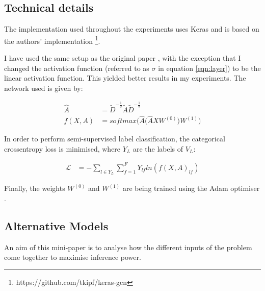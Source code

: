 \documentclass[10pt,a4]{article}
\begin{document}
    \subsection{Technical details}

    The implementation used throughout the experiments uses Keras \cite{chollet2015} 
    and is based on the authors' implementation \footnote{https://github.com/tkipf/keras-gcn}.

    I have used the same setup as the original paper \cite{kipf2016semi}, with 
    the exception that I changed the activation function (referred to as $\sigma$
    in equation \ref{eqn:layer}) to be the linear activation function. This yielded
    better results in my experiments. The network used is given by:
   
    \begin{align}
        \hat{A} &= \tilde{D}^{-\frac{1}{2}} \tilde{A} \tilde{D}^{-\frac{1}{2}} \\
        \label{eqn:kipfmodel}
        f(X, A) &= softmax\Big(\hat{A}\big(\hat{A}XW^{(0)}\big)W^{(1)}\Big)
    \end{align}

    In order to perform semi-supervised label classification, the categorical
    cross\-entropy loss is minimised, where $Y_L$ are the labels of $V_L$:

    \begin{align*}
        \mathcal{L} &= - \sum_{l\in Y_L}\sum_{f=1}^F Y_{lf}ln(f(X,A)_{lf})
    \end{align*}

    Finally, the weights $W^{(0)}$ and $W^{(1)}$ are being trained using the Adam
    optimiser \cite{kingma2014adam}. 

    \subsection{Alternative Models}

    An aim of this mini-paper is to analyse how the different inputs of the 
    problem come together to maximise inference power.
    
\end{document}
